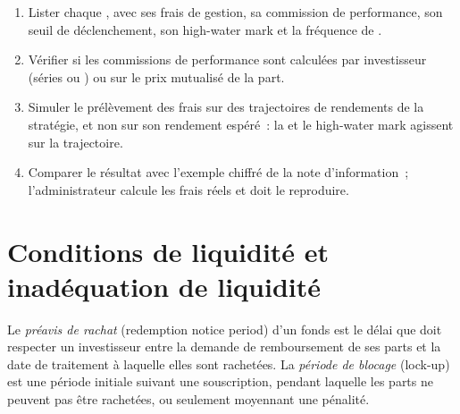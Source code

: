 \begin{method}\label{met:fm:the-asset-manager-and-the-fund:fees}
\begin{enumerate}
\item Lister chaque , avec ses frais de gestion, sa commission de performance, son seuil de déclenchement, son high-water mark et la fréquence de .
\item Vérifier si les commissions de performance sont calculées par investisseur (séries ou ) ou sur le prix mutualisé de la part.
\item Simuler le prélèvement des frais sur des trajectoires de rendements de la stratégie, et non sur son rendement espéré~: la  et le high-water mark agissent sur la trajectoire.
\item Comparer le résultat avec l'exemple chiffré de la note d'information~; l'administrateur calcule les frais réels et doit le reproduire.
\end{enumerate}
\end{method}

\section{Conditions de liquidité et inadéquation de liquidité}

\begin{definition}\label{def:fm:the-asset-manager-and-the-fund:notice}
Le \emph{préavis de rachat} (redemption notice period) d'un fonds est le délai que doit respecter un investisseur entre la demande de remboursement de ses parts et
la date de traitement à laquelle elles sont rachetées. La \emph{période de blocage} (lock-up) est une période initiale suivant une souscription, pendant laquelle
les parts ne peuvent pas être rachetées, ou seulement moyennant une pénalité.
\end{definition}


